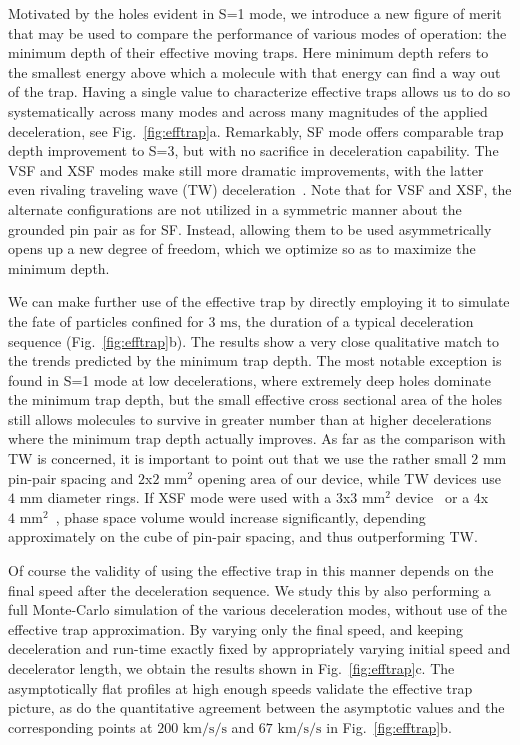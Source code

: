 \documentclass[%
 reprint,
 amsmath,amssymb,
 aps,
prl,
]{revtex4-1}
\newcommand{\ST}{{S=3}}
\begin{document}
Motivated by the holes evident in S=1 mode, we introduce a new figure of merit that may be used to compare the performance of various modes of operation: the minimum depth of their effective moving traps.
Here minimum depth refers to the smallest energy above which a molecule with that energy can find a way out of the trap.
Having a single value to characterize effective traps allows us to do so systematically across many modes and across many magnitudes of the applied deceleration, see Fig.~\ref{fig:efftrap}a. Remarkably, SF mode offers comparable trap depth improvement to \ST, but with no sacrifice in deceleration capability. 
The VSF and XSF modes make still more dramatic improvements, with the latter even rivaling traveling wave (TW) deceleration~\cite{Osterwalder2010}. 
Note that for VSF and XSF, the alternate configurations are not utilized in a symmetric manner about the grounded pin pair as for SF. 
Instead, allowing them to be used asymmetrically opens up a new degree of freedom, which we optimize so as to maximize the minimum depth.

We can make further use of the effective trap by directly employing it to simulate the fate of particles confined for $3\text{ ms}$, the duration of a typical deceleration sequence (Fig.~\ref{fig:efftrap}b). 
The results show a very close qualitative match to the trends predicted by the minimum trap depth. 
The most notable exception is found in S=1 mode at low decelerations, where extremely deep holes dominate the minimum trap depth, but the small effective cross sectional area of the holes still allows molecules to survive in greater number than at higher decelerations where the minimum trap depth actually improves.
As far as the comparison with TW is concerned, it is important to point out that we use the rather small $2\text{ mm}$ pin-pair spacing and $2$x$2\text{ mm}^2$ opening area of our device, while TW devices use $4\text{ mm}$ diameter rings.
If XSF mode were used with a $3$x$3\text{ mm}^2$ device~\cite{Scharfenberg2009} or a $4$x$4\text{ mm}^2$~\cite{VandeMeerakker2005}, phase space volume would increase significantly, depending approximately on the cube of pin-pair spacing, and thus outperforming TW. 

Of course the validity of using the effective trap in this manner depends on the final speed after the deceleration sequence.
We study this by also performing a full Monte-Carlo simulation of the various deceleration modes, without use of the effective trap approximation.
By varying only the final speed, and keeping deceleration and run-time exactly fixed by appropriately varying initial speed and decelerator length, we obtain the results shown in Fig.~\ref{fig:efftrap}c. 
The asymptotically flat profiles at high enough speeds validate the effective trap picture, as do the quantitative agreement between the asymptotic values and the corresponding points at $200\text{ km/s/s}$ and $67\text{ km/s/s}$ in Fig.~\ref{fig:efftrap}b. 
\end{document}
